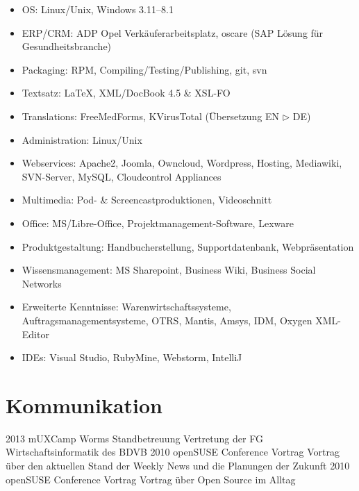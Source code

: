 \documentclass[a4paper,latin]{friggeri-cv} %
\begin{document}
\begin{itemize}
\item OS: Linux/Unix, Windows 3.11--8.1
\item ERP/CRM: ADP Opel Verkäuferarbeitsplatz, oscare (SAP Lösung für Gesundheitsbranche)
\item Packaging: RPM, Compiling/Testing/Publishing, git, svn
\item Textsatz: \LaTeX, XML/DocBook 4.5 \& XSL-FO
\item Translations: FreeMedForms, KVirusTotal (Übersetzung EN $\triangleright$ DE)
\item Administration: Linux/Unix
\item Webservices: Apache2, Joomla, Owncloud, Wordpress, Hosting, Mediawiki, SVN-Server, MySQL, Cloudcontrol Appliances
\item Multimedia: Pod- \& Screencastproduktionen, Videoschnitt
\item Office: MS/Libre-Office, Projektmanagement-Software, Lexware
\item Produktgestaltung: Handbucherstellung, Supportdatenbank, Webpräsentation
\item Wissensmanagement: MS Sharepoint, Business Wiki, Business Social Networks
\item Erweiterte Kenntnisse: Warenwirtschaftssysteme, Auftragsmanagementsysteme, OTRS, Mantis, Amsys, IDM, Oxygen XML-Editor
\item IDEs: Visual Studio, RubyMine, Webstorm, IntelliJ
\end{itemize}


\section{Kommunikation}

\begin{entrylist}
\entry
{2013}
{mUXCamp Worms}
{Standbetreuung}
{Vertretung der FG Wirtschaftsinformatik des BDVB}
\entry
{2010}
{openSUSE Conference}
{Vortrag}
{Vortrag über den aktuellen Stand der Weekly News und die Planungen der Zukunft}
\entry
{2010}
{openSUSE Conference}
{Vortrag}
{Vortrag über Open Source im Alltag}
\end{entrylist}
\end{document}
